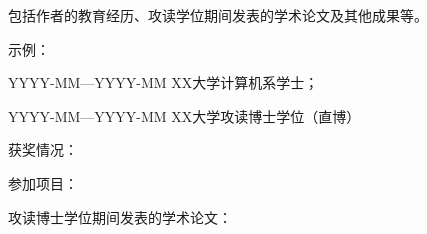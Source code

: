 \begin{resume}
    包括作者的教育经历、攻读学位期间发表的学术论文及其他成果等。

    \noindent 示例：

    {\centering
    YYYY-MM—YYYY-MM XX大学计算机系学士；

    YYYY-MM—YYYY-MM XX大学攻读博士学位（直博）

    获奖情况：

    参加项目：

    攻读博士学位期间发表的学术论文：

    }
\end{resume}

